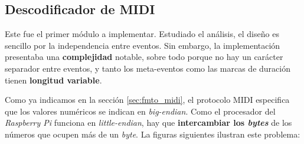 \subsection{Descodificador de MIDI}

Este fue el primer módulo a implementar. Estudiado el análisis, el diseño es sencillo por la independencia entre eventos. Sin embargo, la implementación presentaba una \textbf{complejidad} notable, sobre todo porque no hay un carácter separador entre eventos, y tanto los meta-eventos como las marcas de duración tienen \textbf{longitud variable}.

Como ya indicamos en la sección \ref{sec:fmto_midi}, el protocolo \acrshort{MIDI} especifica que los valores numéricos se indican en \textit{big-endian}. Como el procesador del \textit{Raspberry Pi} funciona en \textit{little-endian}, hay que \textbf{intercambiar los \textit{bytes}} de los números que ocupen más de un \textit{byte}. La figuras siguientes ilustran este problema:

\smallskip

